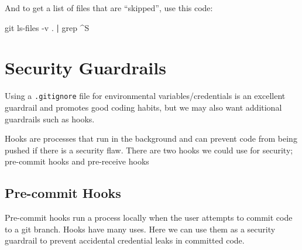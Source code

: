 \documentclass[
  letterpaper,
  DIV=11,
  numbers=noendperiod,
  oneside]{scrartcl}
\newenvironment{Shaded}{\begin{snugshade}}{\end{snugshade}}
\newcommand{\AttributeTok}[1]{\textcolor[rgb]{0.40,0.45,0.13}{#1}}
\newcommand{\FunctionTok}[1]{\textcolor[rgb]{0.28,0.35,0.67}{#1}}
\newcommand{\KeywordTok}[1]{\textcolor[rgb]{0.00,0.23,0.31}{\textbf{#1}}}
\newcommand{\NormalTok}[1]{\textcolor[rgb]{0.00,0.23,0.31}{#1}}
\begin{document}
And to get a list of files that are ``skipped'', use this code:

\begin{Shaded}
\begin{Highlighting}[]
\FunctionTok{git}\NormalTok{ ls{-}files }\AttributeTok{{-}v}\NormalTok{ . }\KeywordTok{|} \FunctionTok{grep}\NormalTok{ \^{}S}
\end{Highlighting}
\end{Shaded}

\newpage{}

\section{Security Guardrails}\label{security-guardrails}

Using a \texttt{.gitignore} file for environmental variables/credentials
is an excellent guardrail and promotes good coding habits, but we may
also want additional guardrails such as hooks.

Hooks are processes that run in the background and can prevent code from
being pushed if there is a security flaw. There are two hooks we could
use for security; pre-commit hooks and pre-receive hooks

\subsection{Pre-commit Hooks}\label{pre-commit-hooks}

Pre-commit hooks run a process locally when the user attempts to commit
code to a git branch. Hooks have many uses. Here we can use them as a
security guardrail to prevent accidental credential leaks in committed
code.
\end{document}
